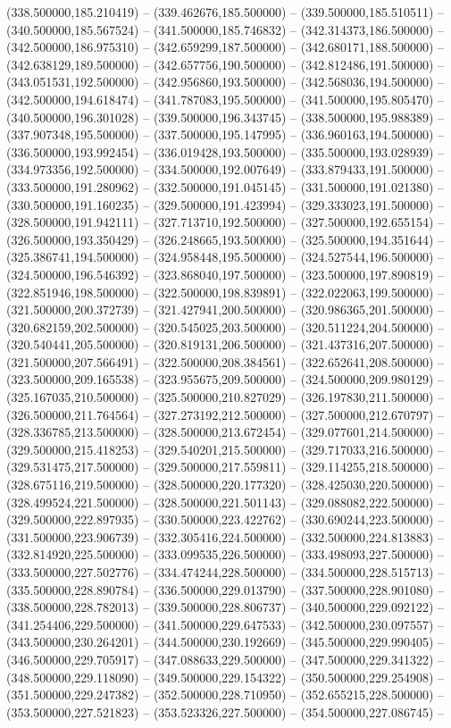 (338.500000,185.210419) -- (339.462676,185.500000) -- (339.500000,185.510511) -- (340.500000,185.567524) -- (341.500000,185.746832) -- (342.314373,186.500000) -- (342.500000,186.975310) -- (342.659299,187.500000) -- (342.680171,188.500000) -- (342.638129,189.500000) -- (342.657756,190.500000) -- (342.812486,191.500000) -- (343.051531,192.500000) -- (342.956860,193.500000) -- (342.568036,194.500000) -- (342.500000,194.618474) -- (341.787083,195.500000) -- (341.500000,195.805470) -- (340.500000,196.301028) -- (339.500000,196.343745) -- (338.500000,195.988389) -- (337.907348,195.500000) -- (337.500000,195.147995) -- (336.960163,194.500000) -- (336.500000,193.992454) -- (336.019428,193.500000) -- (335.500000,193.028939) -- (334.973356,192.500000) -- (334.500000,192.007649) -- (333.879433,191.500000) -- (333.500000,191.280962) -- (332.500000,191.045145) -- (331.500000,191.021380) -- (330.500000,191.160235) -- (329.500000,191.423994) -- (329.333023,191.500000) -- (328.500000,191.942111) -- (327.713710,192.500000) -- (327.500000,192.655154) -- (326.500000,193.350429) -- (326.248665,193.500000) -- (325.500000,194.351644) -- (325.386741,194.500000) -- (324.958448,195.500000) -- (324.527544,196.500000) -- (324.500000,196.546392) -- (323.868040,197.500000) -- (323.500000,197.890819) -- (322.851946,198.500000) -- (322.500000,198.839891) -- (322.022063,199.500000) -- (321.500000,200.372739) -- (321.427941,200.500000) -- (320.986365,201.500000) -- (320.682159,202.500000) -- (320.545025,203.500000) -- (320.511224,204.500000) -- (320.540441,205.500000) -- (320.819131,206.500000) -- (321.437316,207.500000) -- (321.500000,207.566491) -- (322.500000,208.384561) -- (322.652641,208.500000) -- (323.500000,209.165538) -- (323.955675,209.500000) -- (324.500000,209.980129) -- (325.167035,210.500000) -- (325.500000,210.827029) -- (326.197830,211.500000) -- (326.500000,211.764564) -- (327.273192,212.500000) -- (327.500000,212.670797) -- (328.336785,213.500000) -- (328.500000,213.672454) -- (329.077601,214.500000) -- (329.500000,215.418253) -- (329.540201,215.500000) -- (329.717033,216.500000) -- (329.531475,217.500000) -- (329.500000,217.559811) -- (329.114255,218.500000) -- (328.675116,219.500000) -- (328.500000,220.177320) -- (328.425030,220.500000) -- (328.499524,221.500000) -- (328.500000,221.501143) -- (329.088082,222.500000) -- (329.500000,222.897935) -- (330.500000,223.422762) -- (330.690244,223.500000) -- (331.500000,223.906739) -- (332.305416,224.500000) -- (332.500000,224.813883) -- (332.814920,225.500000) -- (333.099535,226.500000) -- (333.498093,227.500000) -- (333.500000,227.502776) -- (334.474244,228.500000) -- (334.500000,228.515713) -- (335.500000,228.890784) -- (336.500000,229.013790) -- (337.500000,228.901080) -- (338.500000,228.782013) -- (339.500000,228.806737) -- (340.500000,229.092122) -- (341.254406,229.500000) -- (341.500000,229.647533) -- (342.500000,230.097557) -- (343.500000,230.264201) -- (344.500000,230.192669) -- (345.500000,229.990405) -- (346.500000,229.705917) -- (347.088633,229.500000) -- (347.500000,229.341322) -- (348.500000,229.118090) -- (349.500000,229.154322) -- (350.500000,229.254908) -- (351.500000,229.247382) -- (352.500000,228.710950) -- (352.655215,228.500000) -- (353.500000,227.521823) -- (353.523326,227.500000) -- (354.500000,227.086745) -- 